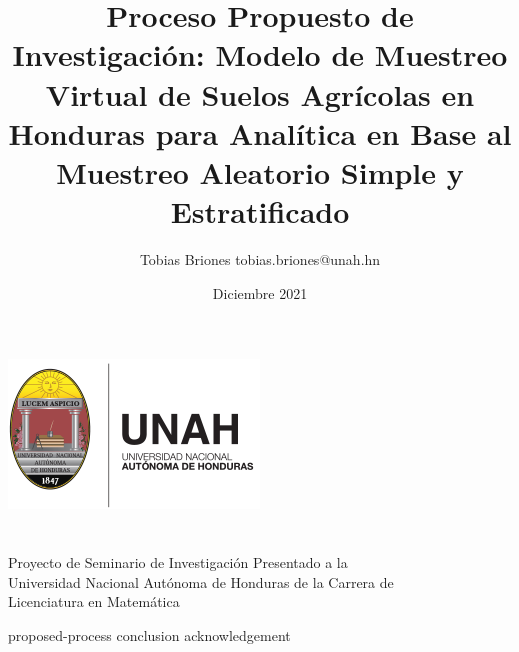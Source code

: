 \documentclass{article}
\title{Proceso Propuesto de Investigación: Modelo de Muestreo Virtual de Suelos Agrícolas en Honduras para Analítica en Base al Muestreo Aleatorio Simple y Estratificado}
\author{Tobias Briones \bigbreak tobias.briones@unah.hn}
\date{Diciembre 2021}
\begin{document}
\makeatletter
    \begin{titlepage}
        \begin{center}
            \includegraphics[width=0.3\linewidth]{ref/logo-unah.png}\\[4ex]
            {\huge \bfseries \@title
            \vspace{1cm}}\\[2ex]
            {\LARGE \@author}\\[50ex]

            {\large
            Proyecto de Seminario de Investigación Presentado a la\\
            Universidad Nacional Autónoma de Honduras de la Carrera de\\
            Licenciatura en Matemática
            }\\[2ex]

            {\large \@date}
        \end{center}
    \end{titlepage}
\makeatother
\thispagestyle{empty}
\newpage

{proposed-process}
{conclusion}
{acknowledgement}

\printbibliography
\end{document}
